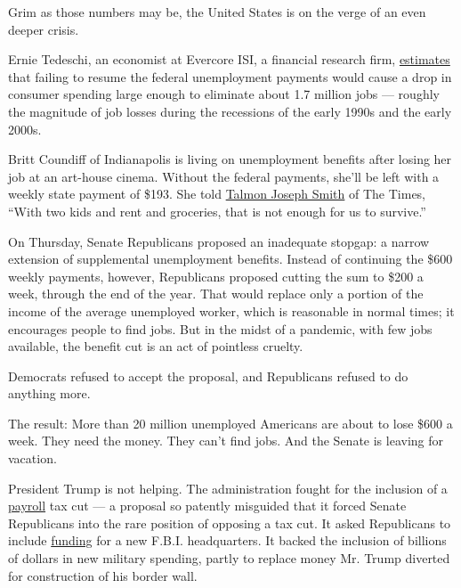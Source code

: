 Grim as those numbers may be, the United States is on the verge of an
even deeper crisis.

Ernie Tedeschi, an economist at Evercore ISI, a financial research firm,
\href{https://twitter.com/ernietedeschi/status/1283834505627865088}{estimates}
that failing to resume the federal unemployment payments would cause a
drop in consumer spending large enough to eliminate about 1.7 million
jobs --- roughly the magnitude of job losses during the recessions of
the early 1990s and the early 2000s.

Britt Coundiff of Indianapolis is living on unemployment benefits after
losing her job at an art-house cinema. Without the federal payments,
she'll be left with a weekly state payment of \$193. She told
\href{https://www.nytimes.com/2020/07/22/opinion/sunday/unemployment-supplement-congress.html}{Talmon
Joseph Smith} of The Times, ``With two kids and rent and groceries, that
is not enough for us to survive.''

On Thursday, Senate Republicans proposed an inadequate stopgap: a narrow
extension of supplemental unemployment benefits. Instead of continuing
the \$600 weekly payments, however, Republicans proposed cutting the sum
to \$200 a week, through the end of the year. That would replace only a
portion of the income of the average unemployed worker, which is
reasonable in normal times; it encourages people to find jobs. But in
the midst of a pandemic, with few jobs available, the benefit cut is an
act of pointless cruelty.

Democrats refused to accept the proposal, and Republicans refused to do
anything more.

The result: More than 20 million unemployed Americans are about to lose
\$600 a week. They need the money. They can't find jobs. And the Senate
is leaving for vacation.

President Trump is not helping. The administration fought for the
inclusion of a
\href{https://www.nytimes.com/2020/07/23/business/payroll-tax-cut-trump-recession.html}{payroll}
tax cut --- a proposal so patently misguided that it forced Senate
Republicans into the rare position of opposing a tax cut. It asked
Republicans to include
\href{https://www.nytimes.com/2020/07/28/us/politics/republicans-trump-fbi-building-virus-relief-bill.html}{funding}
for a new F.B.I. headquarters. It backed the inclusion of billions of
dollars in new military spending, partly to replace money Mr. Trump
diverted for construction of his border wall.

